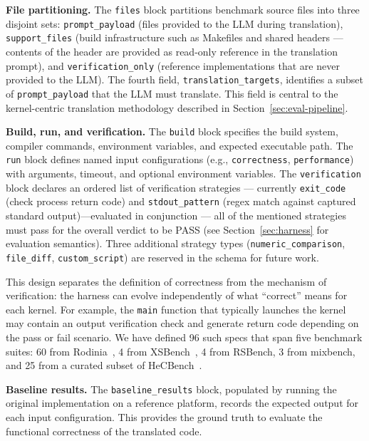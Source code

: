 \documentclass{article}
\begin{document}
\textbf{File partitioning.} The \texttt{files} block partitions benchmark source files into three disjoint sets: \texttt{prompt\_payload} (files provided to the LLM during translation), \texttt{support\_files} (build infrastructure such as Makefiles and shared headers --- contents of the header are provided as read-only reference in the translation prompt), and \texttt{verification\_only} (reference implementations that are never provided to the LLM). The fourth field, \texttt{translation\_targets}, identifies a subset of \texttt{prompt\_payload} that the LLM must translate. This field is central to the kernel-centric translation methodology described in Section~\ref{sec:eval-pipeline}.

\textbf{Build, run, and verification.} The \texttt{build} block specifies the build system, compiler commands, environment variables, and expected executable path. The \texttt{run} block defines named input configurations (e.g., \texttt{correctness}, \texttt{performance}) with arguments, timeout, and optional environment variables. The \texttt{verification} block declares an ordered list of verification strategies --- currently \texttt{exit\_code} (check process return code) and \texttt{stdout\_pattern} (regex match against captured standard output)---evaluated in conjunction --- all of the mentioned strategies must pass for the overall verdict to be PASS (see Section~\ref{sec:harness} for evaluation semantics). Three additional strategy types (\texttt{numeric\_comparison}, \texttt{file\_diff}, \texttt{custom\_script}) are reserved in the schema for future work. 

This design separates the definition of correctness from the mechanism of verification: the harness can evolve independently of what ``correct'' means for each kernel. For example, the \texttt{main} function that typically launches the kernel may contain an output verification check and generate return code depending on the pass or fail scenario. We have defined 96 such specs that span five benchmark suites: 60 from Rodinia~\cite{Rodinia2009}, 4 from XSBench~\cite{XSBench2014}, 4 from RSBench, 3 from mixbench, and 25 from a curated subset of HeCBench~\cite{HeCBench2023}.

\textbf{Baseline results.} The \texttt{baseline\_results} block, populated by running the original implementation on a reference platform, records the expected output for each input configuration. This provides the ground truth to evaluate the functional correctness of the translated code.
\end{document}
